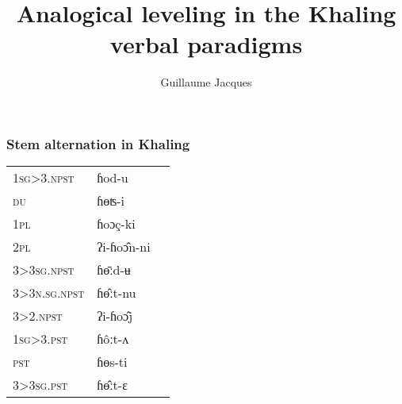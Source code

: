 \documentclass[xcolor=table]{beamer}
\newcommand{\ipa}[1]{{\phon \mbox{#1}}} %
\begin{document}
 \title{Analogical leveling in the Khaling verbal paradigms}
 \author{Guillaume Jacques}
 \maketitle
 
  \begin{frame} 
 \frametitle{Stem alternation in Khaling} 
 
  
  \begin{table}
\centering

\begin{tabular}{lll}


\textsc{1sg>3.npst} &  \ipa{ɦod-u} \\ 
\textsc{du} &  \ipa{ɦɵʦ-i} \\ 
\textsc{1pl} &  \ipa{ɦoɔç-ki} \\ 
\textsc{2pl} &  \ipa{ʔi-ɦoɔ̂n-ni} \\ 
\textsc{3>3sg.npst} &  \ipa{ɦɵ̄ːd-ʉ} \\ 
\textsc{3>3n.sg.npst} &  \ipa{ɦɵ̂ːt-nu} \\ 
\textsc{3>2.npst} &  \ipa{ʔi-ɦoɔ̂j} \\ 
\textsc{1sg>3.pst} &  \ipa{ɦôːt-ʌ} \\ 
\textsc{pst} &  \ipa{ɦɵs-ti} \\ 
\textsc{3>3sg.pst} &  \ipa{ɦɵ̂ːt-ɛ} \\ 
\end{tabular}
\end{table}
  \end{frame}   
\end{document}

